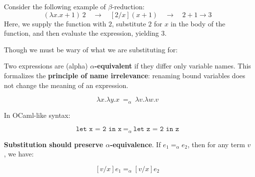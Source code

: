 \begin{Example}

    \noindent
    Consider the following example of $\beta$-reduction:
    \Large
    \[
    (\lambda x. x + 1)\ 2 \quad \rightarrow \quad [2/x](x + 1) \quad\rightarrow\quad 2 + 1 \rightarrow 3
    \]
    \normalsize
    \noindent
    Here, we supply the function with \(2\), substitute \(2\) for \(x\) in the body of the function, and then evaluate the expression, yielding \(3\).
\end{Example}

\newpage
\noindent
Though we must be wary of what we are substituting for:
\begin{Def}

    Two expressions are (alpha) \textbf{$\alpha$-equivalent} if they differ only variable names. 
    This formalizes the \textbf{principle of name irrelevance}: renaming bound variables does not change the meaning of an expression.
    
    \LARGE
    \[
    \lambda x. \lambda y. x \ =_\alpha\ \lambda v. \lambda w. v
    \]
    
    \normalsize
    \noindent
    In OCaml-like syntax:
    
    \vspace{-1em}
    \LARGE
    \[
    \texttt{let x = 2 in x} \ =_\alpha\ \texttt{let z = 2 in z}
    \]
    
    \normalsize
    \noindent
    \textbf{Substitution should preserve $\alpha$-equivalence}. If \( e_1 =_\alpha e_2 \), then for any term \( v \), we have:
    
    \vspace{-1em}
    \LARGE
    \[
    [v/x]e_1 =_\alpha [v/x]e_2
    \]
    \normalsize
    \end{Def}



